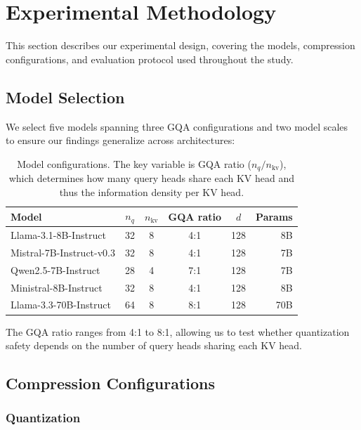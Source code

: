\section{Experimental Methodology}
\label{sec:method}

This section describes our experimental design, covering the models, compression configurations, and evaluation protocol used throughout the study.

\subsection{Model Selection}

We select five models spanning three GQA configurations and two model scales to ensure our findings generalize across architectures:

\begin{table}[h]
\centering
\small
\begin{tabular}{lccccr}
\toprule
\textbf{Model} & \textbf{$n_q$} & \textbf{$n_\text{kv}$} & \textbf{GQA ratio} & \textbf{$d$} & \textbf{Params} \\
\midrule
Llama-3.1-8B-Instruct & 32 & 8 & 4:1 & 128 & 8B \\
Mistral-7B-Instruct-v0.3 & 32 & 8 & 4:1 & 128 & 7B \\
Qwen2.5-7B-Instruct & 28 & 4 & 7:1 & 128 & 7B \\
Ministral-8B-Instruct & 32 & 8 & 4:1 & 128 & 8B \\
Llama-3.3-70B-Instruct & 64 & 8 & 8:1 & 128 & 70B \\
\bottomrule
\end{tabular}
\caption{Model configurations. The key variable is GQA ratio ($n_q / n_\text{kv}$), which determines how many query heads share each KV head and thus the information density per KV head.}
\label{tab:models}
\end{table}

The GQA ratio ranges from 4:1 to 8:1, allowing us to test whether quantization safety depends on the number of query heads sharing each KV head.

\subsection{Compression Configurations}

\subsubsection{Quantization}

